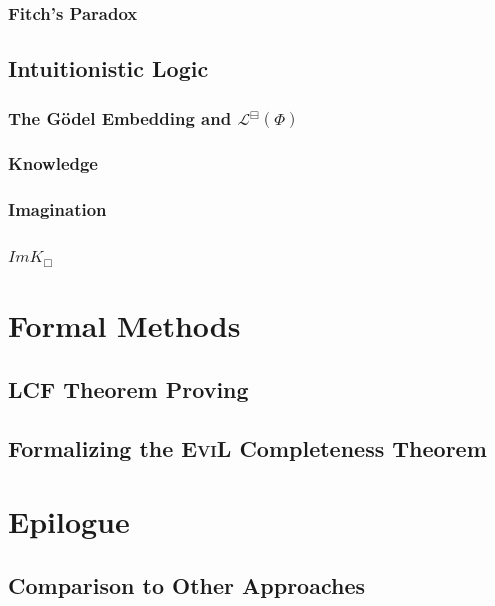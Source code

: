 \documentclass[11pt]{article}
\numberwithin{equation}{subsection}
\newcommand{\BB}{\boxminus}
\begin{document}
\subsubsection{Fitch's Paradox}
\subsection{Intuitionistic Logic}
\subsubsection{The G\"{o}del Embedding and $\mathcal{L}^\BB(\Phi)$}
\subsubsection{Knowledge}
\subsubsection{Imagination}
\subsubsection{$ImK_\Box$}

\section{Formal Methods}\label{formal}

\subsection{LCF Theorem Proving}
\subsection{Formalizing the \textsc{EviL} Completeness Theorem}

\section{Epilogue}
\subsection{Comparison to Other Approaches}
% 
\end{document}
